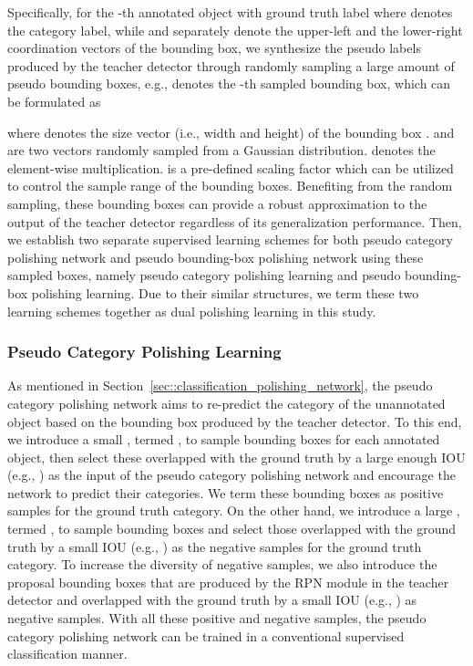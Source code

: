\documentclass[letterpaper]{article} \usepackage{aaai23}  \usepackage{times}  \usepackage{helvet}  \usepackage{courier}  \usepackage[hyphens]{url}  \usepackage{graphicx} \urlstyle{rm} \def\UrlFont{\rm}  \usepackage{natbib}  \usepackage{caption} \frenchspacing  \setlength{\pdfpagewidth}{8.5in}  \setlength{\pdfpageheight}{11in}  \usepackage{algorithm}
\begin{document}
Specifically, for the -th annotated object with ground truth label  where  denotes the category label, while  and  separately denote the upper-left and the lower-right coordination vectors of the bounding box, we synthesize the pseudo labels produced by the teacher detector through randomly sampling a large amount of pseudo bounding boxes, e.g.,  denotes the -th sampled bounding box, which can be formulated as  

where  denotes the size vector (i.e., width and height) of the bounding box .  and  are two vectors randomly sampled from a Gaussian distribution.  denotes the element-wise multiplication.  is a pre-defined scaling factor which can be utilized to control the sample range of the bounding boxes. Benefiting from the random sampling, these bounding boxes can provide a robust approximation to the output of the teacher detector regardless of its generalization performance. Then, we establish two separate supervised learning schemes for both pseudo category polishing network and pseudo bounding-box polishing network using these sampled boxes, namely pseudo category polishing learning and pseudo bounding-box polishing learning. Due to their similar structures, we term these two learning schemes together as dual polishing learning in this study.

\subsubsection{\textbf{Pseudo Category Polishing Learning}}
As mentioned in Section~\ref{sec::classification_polishing_network}, the pseudo category polishing network aims to re-predict the category of the unannotated object based on the bounding box produced by the teacher detector. To this end, we introduce a small , termed , to sample  bounding boxes for each annotated object, then select these overlapped with the ground truth by a large enough IOU (e.g., ) as the input of the pseudo category polishing network and encourage the network to predict their categories. We term these bounding boxes as positive samples for the ground truth category. On the other hand, we introduce a large , termed , to sample  bounding boxes and select those overlapped with the ground truth by a small IOU (e.g., ) as the negative samples for the ground truth category. To increase the diversity of negative samples, we also introduce the proposal bounding boxes that are produced by the RPN module in the teacher detector and overlapped with the ground truth by a small IOU (e.g., )  as negative samples. With all these positive and negative samples, the pseudo category polishing network can be trained in a conventional supervised classification manner.
\end{document}
